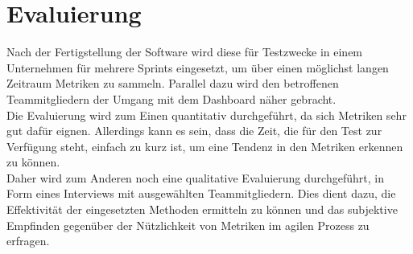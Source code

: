 \clearpage
\section{Evaluierung}

Nach der Fertigstellung der Software wird diese für Testzwecke in einem Unternehmen für mehrere Sprints eingesetzt, um über einen möglichst langen Zeitraum Metriken zu sammeln.
Parallel dazu wird den betroffenen Teammitgliedern der Umgang mit dem Dashboard näher gebracht.
\\
Die Evaluierung wird zum Einen quantitativ durchgeführt, da sich Metriken sehr gut dafür eignen.
Allerdings kann es sein, dass die Zeit, die für den Test zur Verfügung steht, einfach zu kurz ist, um eine Tendenz in den Metriken erkennen zu können.
\\
Daher wird zum Anderen noch eine qualitative Evaluierung durchgeführt, in Form eines Interviews mit ausgewählten Teammitgliedern.
Dies dient dazu, die Effektivität der eingesetzten Methoden ermitteln zu können und das subjektive Empfinden gegenüber der Nützlichkeit von Metriken im agilen Prozess zu erfragen.
